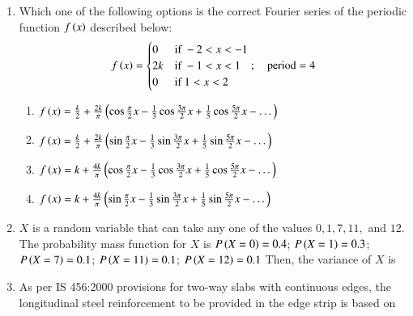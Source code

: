 \documentclass[journal,12pt,onecolumn]{article}
\theoremstyle{remark}
\begin{document}
\begin{enumerate}
\item Which one of the following options is the correct Fourier series of the periodic function $f\left(x\right)$ described below:
\begin{align} f\left(x\right) = 
\begin{cases} 
0 & \text{if } -2 < x < -1 \\
2k & \text{if } -1 < x < 1 \\
0 & \text{if } 1 < x < 2 
\end{cases}
; \quad \text{period} = 4 \end{align}

\hfill{}
\begin{enumerate}
    \item $f\left(x\right) = \frac{k}{2} + \frac{2k}{\pi} \left(\cos{\frac{\pi}{2}x} - \frac{1}{3}\cos{\frac{3\pi}{2}x} + \frac{1}{5}\cos{\frac{5\pi}{2}x} - \dots\right)$
    \item $f\left(x\right) = \frac{k}{2} + \frac{2k}{\pi} \left(\sin{\frac{\pi}{2}x} - \frac{1}{3}\sin{\frac{3\pi}{2}x} + \frac{1}{5}\sin{\frac{5\pi}{2}x} - \dots\right)$
    \item $f\left(x\right) = k + \frac{4k}{\pi} \left(\cos{\frac{\pi}{2}x} - \frac{1}{3}\cos{\frac{3\pi}{2}x} + \frac{1}{5}\cos{\frac{5\pi}{2}x} - \dots\right)$
    \item $f\left(x\right) = k + \frac{4k}{\pi} \left(\sin{\frac{\pi}{2}x} - \frac{1}{3}\sin{\frac{3\pi}{2}x} + \frac{1}{5}\sin{\frac{5\pi}{2}x} - \dots\right)$
\end{enumerate}

\item $X$ is a random variable that can take any one of the values $0, 1, 7, 11,$ and $12$. The probability mass function for $X$ is
$P\left(X=0\right) = 0.4$; $P\left(X=1\right) = 0.3$; $P\left(X=7\right) = 0.1$;
$P\left(X=11\right) = 0.1$; $P\left(X=12\right) = 0.1$
Then, the variance of $X$ is

\hfill{}
\begin{enumerate}
\end{enumerate}

\item As per IS 456:2000 provisions for two-way slabs with continuous edges, the longitudinal steel reinforcement to be provided in the edge strip is based on


\end{enumerate}
\end{document}
